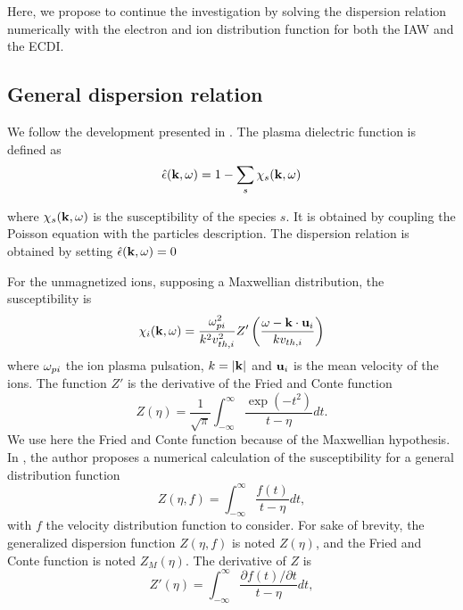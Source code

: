   Here, we propose to continue the investigation by solving the dispersion relation numerically with the electron and ion distribution function for both the \ac{IAW} and the \ac{ECDI}.
  
  
  \subsection{General dispersion relation}
    \label{sec-geneDR}
    
    We follow the development presented in \citet{ducrocq2006,cavalier2013,lafleur2016}.
    The plasma dielectric function is defined as
    \begin{equation} \label{eq-de}
      \hat\epsilon({\mathbf k},\omega) = 1 - \sum_s \chi_s({\mathbf k},\omega)
    \end{equation}
    
    where $\chi_s({\mathbf k}, \omega)$ is the susceptibility of the species $s$.
    It is obtained by coupling the Poisson equation with the particles description.
    The dispersion relation is obtained by setting $  \hat\epsilon({\mathbf k},\omega) =0$
    
    
    For the unmagnetized ions, supposing a Maxwellian distribution, the susceptibility is
    \begin{equation} \label{eq-susceptibility}
      \chi_i({\mathbf k},\omega) = \frac{\omega_{pi}^2}{k^2 v^2_{th, i}} Z'\left( \frac{\omega - {\mathbf k} \cdot {\mathbf u_{i}}}{k v_{th, i}}  \right)
    \end{equation}
    where $\omega_{pi}$ the ion plasma pulsation, $k=\lvert{\mathbf k}\rvert$ and ${\mathbf u_i}$ is the mean velocity of the ions.
    The function $Z'$ is the derivative of the Fried and Conte function \citep{fried1961}
    \begin{equation} \label{eq-friedandConte}
      Z(\eta) = \frac{1}{\sqrt{\pi}} \int_{-\infty}^{\infty} \frac{\exp{(-t^2)}}{t - \eta} dt.
    \end{equation}
    We use here the Fried and Conte function because of the Maxwellian hypothesis.
    In \citet{xiehua-sheng2013}, the author proposes a numerical calculation of the susceptibility for a general distribution function
    \begin{equation} \label{eq-general}
      Z(\eta, f) = \int_{-\infty}^{\infty} \frac{f(t)}{t - \eta} dt,
    \end{equation}
    with $f$ the velocity distribution function to consider.
    For sake of brevity, the generalized dispersion function $Z(\eta,f)$ is noted $Z(\eta)$, and the Fried and Conte function is noted $Z_M(\eta)$.
    The derivative of $Z$ is
    \begin{equation} \label{eq-derivatives}
      Z'(\eta) = \int_{-\infty}^{\infty} \frac{\partial f(t) / \partial t}{t - \eta} dt,
    \end{equation}
    

